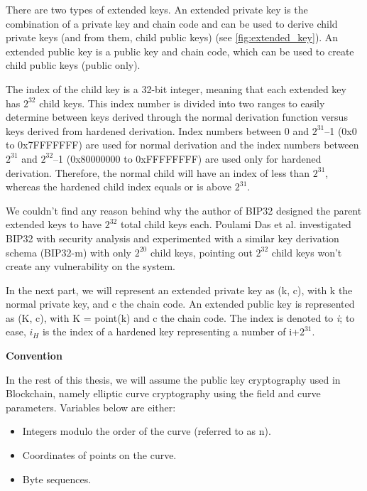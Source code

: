 There are two types of extended keys. An extended private key is the combination of a private key and chain code and can be used to derive child private keys (and from them, child public keys) (see \autoref{fig:extended_key}). An extended public key is a public key and chain code, which can be used to create child public keys (public only).

The index of the child key is a 32-bit integer, meaning that each extended key has $2^{32}$ child keys. This index number is divided into two ranges to easily determine between keys derived through the normal derivation function versus keys derived from hardened derivation. Index numbers between 0 and $2^{31}$–1 (0x0 to 0x7FFFFFFF) are used for normal derivation and the index numbers between $2^{31}$ and $2^{32}$–1 (0x80000000 to 0xFFFFFFFF) are used only for hardened derivation. Therefore, the normal child will have an index of less than $2^{31}$, whereas the hardened child index equals or is above  $2^{31}$.

We couldn’t find any reason behind why the author of BIP32 designed the parent extended keys to have $2^{32}$ total child keys each. Poulami Das et al.\cite{DBLP:conf/ccs/0003EFL021} investigated BIP32 with security analysis and experimented with a similar key derivation schema (BIP32-m) with only $2^{20}$ child keys, pointing out $2^{32}$ child keys won’t create any vulnerability on the system.

In the next part, we will represent an extended private key as (k, c), with k the normal private key, and c the chain code. An extended public key is represented as (K, c), with K = point(k) and c the chain code. The index is denoted to \textit{i}; to ease, $i_H$ is the index of a hardened key representing a number of i+$2^{31}$.

\bigskip
{\textbf{Convention}}

In the rest of this thesis, we will assume the public key cryptography used in Blockchain, namely elliptic curve cryptography using the field and curve parameters. Variables below are either:

\begin{itemize}
    \item Integers modulo the order of the curve (referred to as n).

    \item Coordinates of points on the curve.

    \item Byte sequences.
\end{itemize}

